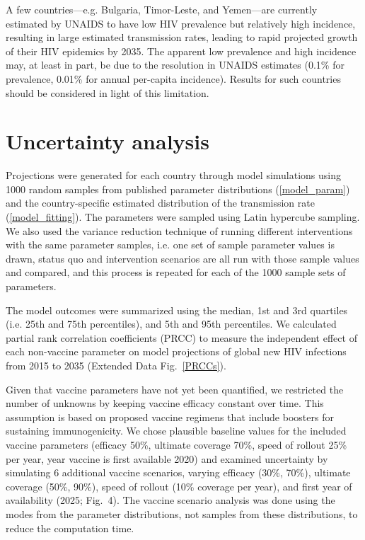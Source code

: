\documentclass{article}
\begin{document}
A few countries—e.g. Bulgaria, Timor-Leste, and Yemen—are currently
estimated by UNAIDS to have low HIV prevalence but relatively high
incidence, resulting in large estimated transmission rates, leading to
rapid projected growth of their HIV epidemics by 2035. The apparent
low prevalence and high incidence may, at least in part, be due to the
resolution in UNAIDS estimates (0.1\% for prevalence, 0.01\% for
annual per-capita incidence).  Results for such countries should be
considered in light of this limitation.


\section{Uncertainty analysis}
\label{uncertainty}

Projections were generated for each country through model simulations
using 1000 random samples from published parameter distributions
(\autoref{model_param}) and the country-specific estimated
distribution of the transmission rate (\autoref{model_fitting}). The
parameters were sampled using Latin hypercube
sampling\cite{blower1994}.  We also used the variance reduction
technique of running different interventions with the same parameter
samples, i.e.  one set of sample parameter values is drawn, status quo
and intervention scenarios are all run with those sample values and
compared, and this process is repeated for each of the 1000 sample
sets of parameters\cite{shechter2006}.

The model outcomes were summarized using the median, 1st and 3rd
quartiles (i.e. 25th and 75th percentiles), and 5th and 95th
percentiles.  We calculated partial rank correlation coefficients
(PRCC)\cite{blower1994} to measure the independent effect of each
non-vaccine parameter on model projections of global new HIV
infections from 2015 to 2035 (Extended Data Fig.~\ref*{PRCCs}).

Given that vaccine parameters have not yet been quantified, we
restricted the number of unknowns by keeping vaccine efficacy constant
over time.  This assumption is based on proposed vaccine regimens that
include boosters for sustaining immunogenicity.  We chose plausible
baseline values for the included vaccine parameters (efficacy 50\%,
ultimate coverage 70\%, speed of rollout 25\% per year, year vaccine
is first available 2020) and examined uncertainty by simulating 6
additional vaccine scenarios, varying efficacy (30\%, 70\%), ultimate
coverage (50\%, 90\%), speed of rollout (10\% coverage per year), and
first year of availability (2025; Fig.~4). The vaccine scenario
analysis was done using the modes from the parameter distributions,
not samples from these distributions, to reduce the computation time.
\end{document}
